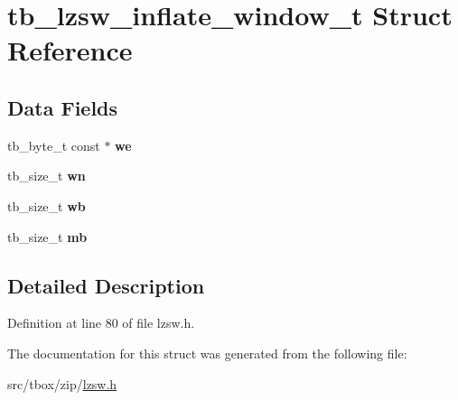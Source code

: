 \hypertarget{structtb__lzsw__inflate__window__t}{\section{tb\-\_\-lzsw\-\_\-inflate\-\_\-window\-\_\-t Struct Reference}
\label{structtb__lzsw__inflate__window__t}
}
\subsection*{Data Fields}
\begin{DoxyCompactItemize}
\item 
\hypertarget{structtb__lzsw__inflate__window__t_ade2d7b533953d1c4613beb01681f518e}{tb\-\_\-byte\-\_\-t const $\ast$ {\bfseries we}}\label{structtb__lzsw__inflate__window__t_ade2d7b533953d1c4613beb01681f518e}

\item 
\hypertarget{structtb__lzsw__inflate__window__t_af9f72a68fa1df899f9370ebfc5a15572}{tb\-\_\-size\-\_\-t {\bfseries wn}}\label{structtb__lzsw__inflate__window__t_af9f72a68fa1df899f9370ebfc5a15572}

\item 
\hypertarget{structtb__lzsw__inflate__window__t_a19d8716f734376a4f9cb6a0c69416648}{tb\-\_\-size\-\_\-t {\bfseries wb}}\label{structtb__lzsw__inflate__window__t_a19d8716f734376a4f9cb6a0c69416648}

\item 
\hypertarget{structtb__lzsw__inflate__window__t_a0a98d5921bf727db96f79c721d061d1f}{tb\-\_\-size\-\_\-t {\bfseries mb}}\label{structtb__lzsw__inflate__window__t_a0a98d5921bf727db96f79c721d061d1f}

\end{DoxyCompactItemize}


\subsection{Detailed Description}


Definition at line 80 of file lzsw.\-h.



The documentation for this struct was generated from the following file\-:\begin{DoxyCompactItemize}
\item 
src/tbox/zip/\hyperlink{lzsw_8h}{lzsw.\-h}\end{DoxyCompactItemize}
